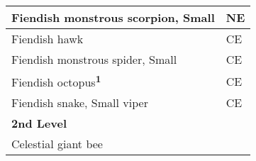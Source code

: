 \begin{longtable}{llll}
{\begin{minipage}[t]{3.326in}
Fiendish monstrous scorpion, Small\end{minipage}} & \multicolumn{3}{p{0.601in}|}{\begin{minipage}[t]{0.601in}\raggedright
NE\end{minipage}}\\
\hline
\multicolumn{1}{|p{3.326in}|}{\begin{minipage}[t]{3.326in}\raggedright
Fiendish hawk\end{minipage}} & \multicolumn{3}{p{0.601in}|}{\begin{minipage}[t]{0.601in}\raggedright
CE\end{minipage}}\\
\hline
\multicolumn{1}{|p{3.326in}|}{\begin{minipage}[t]{3.326in}\raggedright
Fiendish monstrous spider, Small\end{minipage}} & \multicolumn{3}{p{0.601in}|}{\begin{minipage}[t]{0.601in}\raggedright
CE\end{minipage}}\\
\hline
\multicolumn{1}{|p{3.326in}|}{\begin{minipage}[t]{3.326in}\raggedright
Fiendish octopus\textsuperscript{\textbf{1}}\end{minipage}} & \multicolumn{3}{p{0.601in}|}{\begin{minipage}[t]{0.601in}\raggedright
CE\end{minipage}}\\
\hline
\multicolumn{1}{|p{3.326in}|}{\begin{minipage}[t]{3.326in}\raggedright
Fiendish snake, Small viper\end{minipage}} & \multicolumn{3}{p{0.601in}|}{\begin{minipage}[t]{0.601in}\raggedright
CE\end{minipage}}\\
\hline
\multicolumn{1}{|p{3.326in}|}{\begin{minipage}[t]{3.326in}\raggedright
\textbf{2nd Level}\end{minipage}} & \multicolumn{3}{p{0.601in}|}{\begin{minipage}[t]{0.601in}\raggedright
\end{minipage}}\\
\hline
\multicolumn{1}{|p{3.326in}|}{\begin{minipage}[t]{3.326in}\raggedright
Celestial giant bee\end{minipage}} & \multicolumn{3}{p{0.601in}|}{\begin{minipage}[t]{0.601in}\raggedright

\end{minipage}}
\end{longtable}
